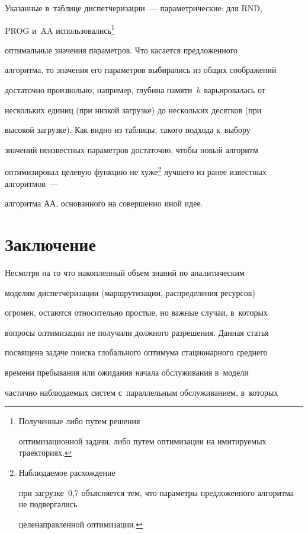 \addtocounter{footnote}{2}


  Указанные в~таблице диспетчеризации~--- параметрические: для RND, 


PROG и~AA использовались\footnote{Полученные либо путем решения 


оптимизационной задачи, либо путем оптимизации на имитируемых траекториях.} 


оптимальные значения параметров. Что касается предложенного 


алгоритма, то значения его параметров выбирались из общих соображений 


достаточно произвольно; например, глубина памяти~$h$ варьировалась от 


нескольких единиц (при низкой загрузке) до нескольких десятков (при 


высокой загрузке). Как видно из таблицы, такого подхода к~выбору 


значений неизвестных параметров достаточно, чтобы новый алгоритм 


оптимизировал целевую функцию не хуже\footnote{Наблюдаемое расхождение 


при загрузке~0,7 объясняется тем, что параметры предложенного алгоритма не подвергались 


целенаправленной оптимизации.} лучшего из ранее известных алгоритмов~--- 


алгоритма АА, основанного на совершенно иной идее. 





\section{Заключение}


  


  Несмотря на то что накопленный объем знаний по аналитическим 


моделям диспетчеризации (маршрутизации, распределения ресурсов) 


огромен, остаются относительно простые, но важные случаи, в~которых 


вопросы оптимизации не получили должного разрешения. Данная статья 


посвящена задаче поиска глобального оптимума стационарного среднего 


времени пребывания или ожидания начала обслуживания в~модели 


частично наблюдаемых систем с~параллельным обслуживанием, в~которых 


